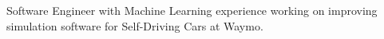 
\begin{cvparagraph}
  Software Engineer with Machine Learning experience working on improving
  simulation software for Self-Driving Cars at Waymo.
\end{cvparagraph}

